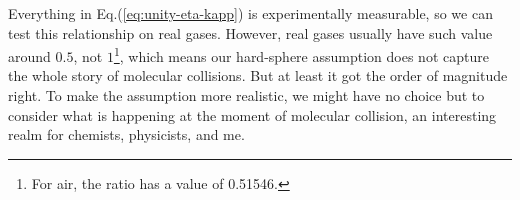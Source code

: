 Everything in Eq.(\ref{eq:unity-eta-kapp}) is experimentally measurable, so we can test this relationship on real gases. However, real gases usually have such value around $ 0.5 $, not $ 1 $\footnote{For air, the ratio has a value of 0.51546.}, which means our hard-sphere assumption does not capture the whole story of molecular collisions. But at least it got the order of magnitude right. To make the assumption more realistic, we might have no choice but to consider what is happening at the moment of molecular collision, an interesting realm for chemists, physicists, and me.